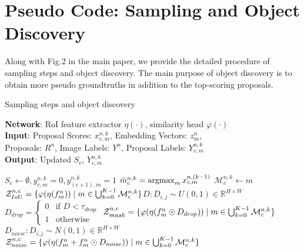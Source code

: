 \documentclass[runningheads]{llncs}
\newcommand{\argmax}{\operatornamewithlimits{argmax}}
\begin{document}
\section{Pseudo Code: Sampling and Object Discovery}
Along with Fig.2 in the main paper, we provide the detailed procedure of sampling steps and object discovery. The main purpose of object discovery is to obtain more pseudo groundtruths in addition to the top-scoring proposals.
\label{sec:pseudo_code}
\begin{algorithm}[H]
\caption{Sampling steps and object discovery}
\textbf{Network}: RoI feature extractor $\eta(\cdot)$, similarity head $\varphi(\cdot)$\\
\textbf{Input}:  Proposal Scores: $x^{n,k}_{c,m}$, Embedding Vectors: $z^{n}_m$,\\
Proposals: $R^n$, Image Labels: $Y^n$, Proposal Labels: $Y^{n,k}_{c,m}$\\
\textbf{Output}: Updated $S_c$, $Y^{n,k}_{c,m}$
\begin{algorithmic}[1]
    \STATE $S_c \leftarrow{\emptyset}, y^{n,k}_{c,m} = 0, y^{n,k}_{(c+1),m} = 1$
          \STATE $\bar{m}^{n,k}_c=\argmax_m {x^{n,(k-1)}_{c,m}}$
                \STATE $\mathcal{M}^{n,k}_c \leftarrow{m}$
            \ENDIF
          \ENDIF
      \ENDFOR
      \STATE $\mathcal{Z}^{n,c}_{IoU} = \{ \varphi(\eta{(f^n_m)})\hspace{0.1cm} | \hspace{0.1cm} m \in \bigcup_{k=0}^{K-1} \mathcal{M}^{n,k}_c \}$\STATE $D: D_{i,j}\sim U(0,1) \in \mathbb{R}^{H \times W}$\STATE $D_{drop} = \begin{cases}
                        0  & \text{if $D < \tau_{drop}$}\\
                        1  & \text{otherwise}
                        \end{cases}$
      \STATE $\mathcal{Z}^{n,c}_{mask} = \{ \varphi(\eta{(f^n_m \odot D_{drop})})\hspace{0.1cm} | \hspace{0.1cm} m \in \bigcup_{k=0}^{K-1} \mathcal{M}^{n,k}_c \}$
      \STATE $D_{noise}: D_{i,j} \sim N(0,1) \in \mathbb{R}^{H \times W}$
      \STATE $\mathcal{Z}^{n,c}_{noise} = \{ \varphi(\eta(f^n_m + f^n_m \odot D_{noise}))\hspace{0.1cm} | \hspace{0.1cm} m \in \bigcup_{k=0}^{K-1} \mathcal{M}^{n,k}_c \}$

\end{algorithmic}
\end{algorithm}
\end{document}
